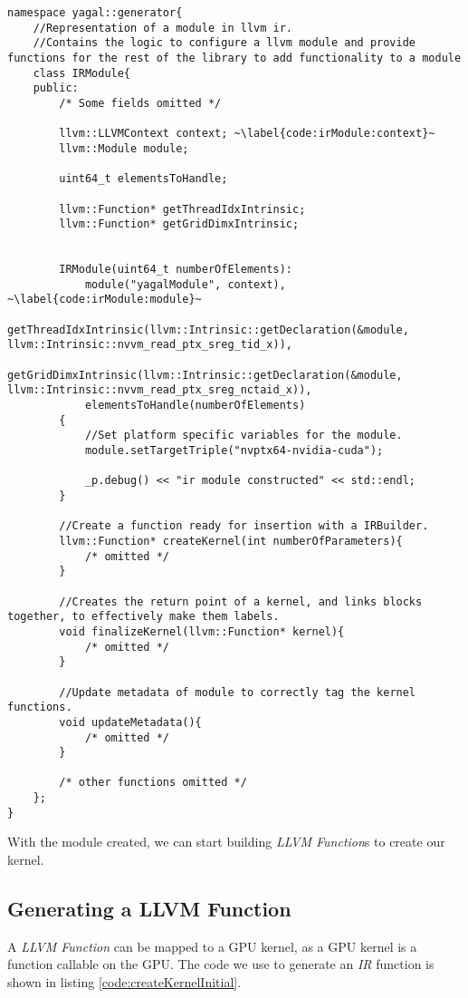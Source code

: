 \begin{lstlisting}[caption={The IRModule class}, label={code:irModule}]
namespace yagal::generator{
    //Representation of a module in llvm ir.
    //Contains the logic to configure a llvm module and provide functions for the rest of the library to add functionality to a module
    class IRModule{
    public:
        /* Some fields omitted */

        llvm::LLVMContext context; ~\label{code:irModule:context}~
        llvm::Module module;

        uint64_t elementsToHandle;

        llvm::Function* getThreadIdxIntrinsic;
        llvm::Function* getGridDimxIntrinsic;


        IRModule(uint64_t numberOfElements): 
            module("yagalModule", context), ~\label{code:irModule:module}~
            getThreadIdxIntrinsic(llvm::Intrinsic::getDeclaration(&module, llvm::Intrinsic::nvvm_read_ptx_sreg_tid_x)),
            getGridDimxIntrinsic(llvm::Intrinsic::getDeclaration(&module, llvm::Intrinsic::nvvm_read_ptx_sreg_nctaid_x)),
            elementsToHandle(numberOfElements)
        {
            //Set platform specific variables for the module.
            module.setTargetTriple("nvptx64-nvidia-cuda");

            _p.debug() << "ir module constructed" << std::endl;
        }

        //Create a function ready for insertion with a IRBuilder.
        llvm::Function* createKernel(int numberOfParameters){
            /* omitted */
        }

        //Creates the return point of a kernel, and links blocks together, to effectively make them labels.
        void finalizeKernel(llvm::Function* kernel){
            /* omitted */
        }

        //Update metadata of module to correctly tag the kernel functions.
        void updateMetadata(){
            /* omitted */
        }

        /* other functions omitted */
    };
}
\end{lstlisting}

With the module created, we can start building \textit{LLVM Function}s to create our kernel.

\subsection{Generating a LLVM Function} \label{sec:irFunction}
A \textit{LLVM Function} can be mapped to a GPU kernel, as a GPU kernel is a function callable on the GPU. The code we use to generate an \textit{IR} function is shown in listing \ref{code:createKernelInitial}. 

